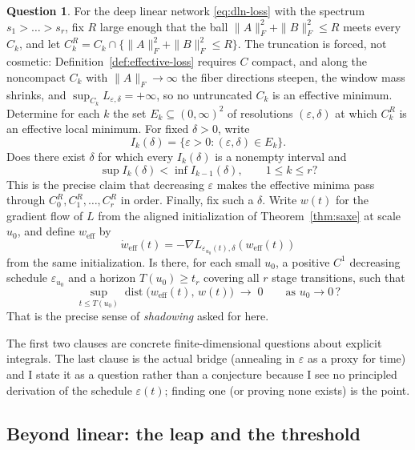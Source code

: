 \documentclass[11pt]{amsart}
\theoremstyle{plain}
\theoremstyle{definition}
\newtheorem{question}[theorem]{Question}
\newcommand{\dist}{\operatorname{dist}}
\begin{document}
\begin{question}\label{q:effective-loss}
For the deep linear network \eqref{eq:dln-loss} with the spectrum $s_1 > \dots > s_r$, fix $R$ large enough that the ball $\| A \|_F^2 + \| B \|_F^2 \le R$ meets every $C_k$, and let $C_k^R = C_k \cap \{ \| A \|_F^2 + \| B \|_F^2 \le R \}$. The truncation is forced, not cosmetic: Definition~\ref{def:effective-loss} requires $C$ compact, and along the noncompact $C_k$ with $\| A \|_F \to \infty$ the fiber directions steepen, the window mass shrinks, and $\sup_{C_k} L_{\varepsilon,\delta} = +\infty$, so no untruncated $C_k$ is an effective minimum. Determine for each $k$ the set $E_k \subseteq (0,\infty)^2$ of resolutions $(\varepsilon, \delta)$ at which $C_k^R$ is an effective local minimum. For fixed $\delta>0$, write
\[
   I_k(\delta)=\{\varepsilon>0:(\varepsilon,\delta)\in E_k\}.
\]
Does there exist $\delta$ for which every $I_k(\delta)$ is a nonempty interval and
\[
   \sup I_k(\delta)<\inf I_{k-1}(\delta),
   \qquad 1\le k\le r?
\]
This is the precise claim that decreasing $\varepsilon$ makes the effective minima pass through $C_0^R,C_1^R,\dots,C_r^R$ in order. Finally, fix such a $\delta$. Write $w(t)$ for the gradient flow of $L$ from the aligned initialization of Theorem~\ref{thm:saxe} at scale $u_0$, and define $w_{\mathrm{eff}}$ by
\[
   \dot w_{\mathrm{eff}}(t)
   =-\nabla L_{\varepsilon_{u_0}(t),\delta}(w_{\mathrm{eff}}(t))
\]
from the same initialization. Is there, for each small $u_0$, a positive $C^1$ decreasing schedule $\varepsilon_{u_0}$ and a horizon $T(u_0)\ge t_r$ covering all $r$ stage transitions, such that
\[
   \sup_{t \le T(u_0)} \dist\bigl( w_{\mathrm{eff}}(t), \, w(t) \bigr) \;\to\; 0 \qquad \text{as } u_0 \to 0 \, ?
\]
That is the precise sense of \emph{shadowing} asked for here.
\end{question}

The first two clauses are concrete finite-dimensional questions about explicit integrals. The last clause is the actual bridge (annealing in $\varepsilon$ as a proxy for time) and I state it as a question rather than a conjecture because I see no principled derivation of the schedule $\varepsilon(t)$; finding one (or proving none exists) is the point.

\subsection{Beyond linear: the leap and the threshold}\label{sec:leap}
\end{document}
